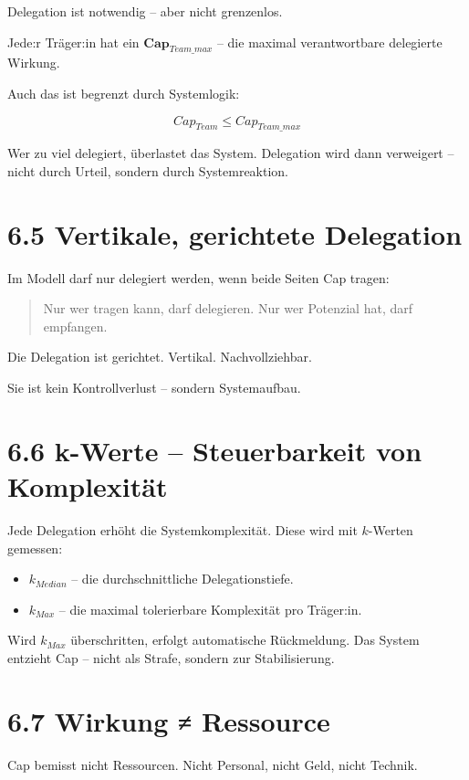 \documentclass[12pt,a4paper]{book}
\begin{document}
Delegation ist notwendig – aber nicht grenzenlos.

Jede:r Träger:in hat ein $\textbf{Cap}_{Team\_max}$ –  
die maximal verantwortbare delegierte Wirkung.

Auch das ist begrenzt durch Systemlogik:

\[
Cap_{Team} \leq Cap_{Team\_max}
\]

Wer zu viel delegiert, überlastet das System.  
Delegation wird dann verweigert – nicht durch Urteil, sondern durch Systemreaktion.

\section*{6.5 Vertikale, gerichtete Delegation}

Im Modell darf nur delegiert werden, wenn beide Seiten Cap tragen:

\begin{quote}
Nur wer tragen kann, darf delegieren.  
Nur wer Potenzial hat, darf empfangen.
\end{quote}

Die Delegation ist gerichtet. Vertikal. Nachvollziehbar.

Sie ist kein Kontrollverlust – sondern Systemaufbau.

\section*{6.6 k-Werte – Steuerbarkeit von Komplexität}

Jede Delegation erhöht die Systemkomplexität.  
Diese wird mit $k$-Werten gemessen:

\begin{itemize}
    \item $k_{Median}$ – die durchschnittliche Delegationstiefe.
    \item $k_{Max}$ – die maximal tolerierbare Komplexität pro Träger:in.
\end{itemize}

Wird $k_{Max}$ überschritten, erfolgt automatische Rückmeldung.  
Das System entzieht Cap – nicht als Strafe, sondern zur Stabilisierung.

\section*{6.7 Wirkung ≠ Ressource}

Cap bemisst nicht Ressourcen.  
Nicht Personal, nicht Geld, nicht Technik.
\end{document}
